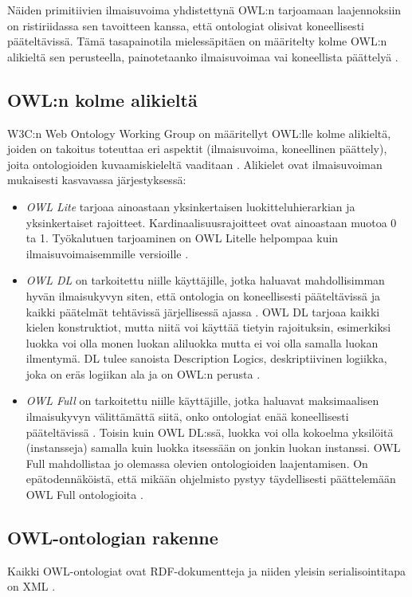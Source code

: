 \documentclass[finnish]{tktltiki2}
\theoremstyle{definition}
\theoremstyle{remark}
\begin{document}
Näiden primitiivien ilmaisuvoima yhdistettynä OWL:n tarjoamaan laajennoksiin
on ristiriidassa sen tavoitteen kanssa, että ontologiat olisivat koneellisesti
pääteltävissä. Tämä tasapainotila mielessäpitäen on määritelty kolme OWL:n
alikieltä sen perusteella, painotetaanko ilmaisuvoimaa vai koneellista päättelyä
\cite{AH09}.  

\subsection{OWL:n kolme alikieltä}

W3C:n Web Ontology Working Group on määritellyt OWL:lle kolme alikieltä, joiden
on takoitus toteuttaa eri aspektit (ilmaisuvoima, koneellinen päättely), joita
ontologioiden kuvaamiskieleltä vaaditaan \cite{MH04}. Alikielet ovat ilmaisuvoiman mukaisesti
kasvavassa järjestyksessä:

\begin{itemize}
 \item \textit{OWL Lite} tarjoaa ainoastaan yksinkertaisen luokitteluhierarkian ja yksinkertaiset rajoitteet\cite{MH04}. Kardinaalisuusrajoitteet ovat ainoastaan muotoa 0 ta 1. Työkalutuen tarjoaminen on OWL Litelle helpompaa kuin ilmaisuvoimaisemmille versioille \cite{MH04}.  
 \item \textit{OWL DL} on tarkoitettu niille käyttäjille, jotka haluavat mahdollisimman hyvän ilmaisukyvyn siten, että ontologia on koneellisesti pääteltävissä ja kaikki päätelmät tehtävissä järjellisessä ajassa \cite{MH04}. OWL DL tarjoaa kaikki kielen konstruktiot, mutta niitä voi käyttää tietyin rajoituksin, esimerkiksi luokka voi olla monen luokan aliluokka mutta ei voi olla samalla luokan ilmentymä. DL tulee sanoista Description Logics, deskriptiivinen logiikka, joka on eräs logiikan ala ja on OWL:n perusta \cite{MH04}.  
 \item \textit{OWL Full} on tarkoitettu niille käyttäjille, jotka haluavat maksimaalisen ilmaisukyvyn välittämättä siitä, onko ontologiat enää koneellisesti pääteltävissä \cite{MH04}. Toisin kuin OWL DL:ssä, luokka voi olla kokoelma yksilöitä (instansseja) samalla kuin luokka itsessään on jonkin luokan instanssi. OWL Full mahdollistaa jo olemassa olevien ontologioiden laajentamisen. On epätodennäköistä, että mikään ohjelmisto pystyy täydellisesti päättelemään OWL Full ontologioita \cite{MH04}. 
\end{itemize}

\subsection{OWL-ontologian rakenne}
Kaikki OWL-ontologiat ovat RDF-dokumentteja ja niiden yleisin serialisointitapa on XML  \cite{SWM04}.
\end{document}
